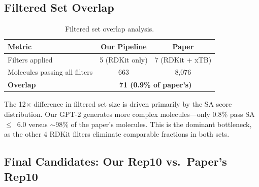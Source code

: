 \documentclass[11pt,a4paper]{article}
\begin{document}
\subsection{Filtered Set Overlap}

\begin{table}[H]
\centering
\caption{Filtered set overlap analysis.}
\label{tab:filter_overlap}
\begin{tabular}{lcc}
\toprule
Metric & Our Pipeline & Paper \\
\midrule
Filters applied & 5 (RDKit only) & 7 (RDKit + xTB) \\
Molecules passing all filters & 663 & 8,076 \\
\textbf{Overlap} & \multicolumn{2}{c}{\textbf{71 (0.9\% of paper's)}} \\
\bottomrule
\end{tabular}
\end{table}

The 12$\times$ difference in filtered set size is driven primarily by the SA score distribution. Our GPT-2 generates more complex molecules---only 0.8\% pass SA~$\leq$~6.0 versus $\sim$98\% of the paper's molecules. This is the dominant bottleneck, as the other 4 RDKit filters eliminate comparable fractions in both sets.

\subsection{Final Candidates: Our Rep10 vs.\ Paper's Rep10}
\end{document}
